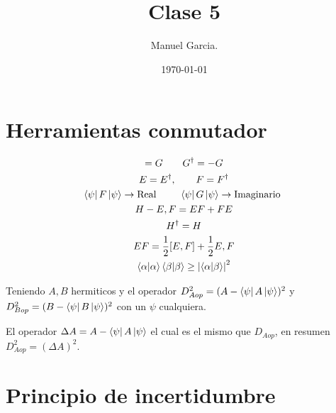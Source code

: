 \documentclass{article}
\title{Clase 5 }
\author{Manuel Garcia.}
\date{\today}
\newcommand{\caja}[3]{%
  \begin{tcolorbox}[colback=#1!5!white,colframe=#1!25!black,title=#2]
    #3
  \end{tcolorbox}%
}
\begin{document}
\maketitle

\section{Herramientas conmutador}
\caja{red}{Propiedades e identidades }{
  \begin{gather}
    [E,F]=G \qquad G ^ {\dag } = -G \\
    E = E ^ {\dag }, \qquad F = F ^ {\dag }\\
    \bra{\psi}F \ket{\psi} \rightarrow \text{Real }\qquad \bra{\psi}G \ket{\psi} \rightarrow \text{Imaginario }\\
    H - {E,F } = EF+FE\\
    H ^ {\dag } = H\\
    EF = \frac{1}{2}[E,F] + \frac{1}{2}{E,F}\\
    \bra{\alpha}\ket{\alpha} \bra{\beta}\ket{\beta} \geq \left|\bra{\alpha}\ket{\beta} \right|^2  
    \label{eq:prop_conmuntador}
  \end{gather}
}

Teniendo $ A,B  $ hermiticos y el operador $ D _{Aop } ^ {2 } = (A-\bra{\psi}A \ket{\psi} )^2  $ y $ D _{Bop } ^ {2 } = (B- \bra{\psi}B \ket{\psi} )^ {2 } $ con un $ \psi  $ cualquiera.

El operador $ \Delta A = A- \bra{\psi}A \ket{\psi}  $ el cual es el mismo que $ D _{Aop }  $, en resumen $ D _{Aop } ^ {2 } = (\Delta A) ^ {2 } $. 

\section{Principio de incertidumbre }
\end{document}
